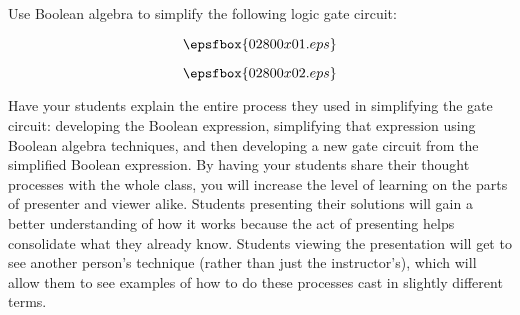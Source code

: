 

Use Boolean algebra to simplify the following logic gate circuit:

$$\epsfbox{02800x01.eps}$$







$$\epsfbox{02800x02.eps}$$







Have your students explain the entire process they used in simplifying the gate circuit: developing the Boolean expression, simplifying that expression using Boolean algebra techniques, and then developing a new gate circuit from the simplified Boolean expression.  By having your students share their thought processes with the whole class, you will increase the level of learning on the parts of presenter and viewer alike.  Students presenting their solutions will gain a better understanding of how it works because the act of presenting helps consolidate what they already know.  Students viewing the presentation will get to see another person's technique (rather than just the instructor's), which will allow them to see examples of how to do these processes cast in slightly different terms.





